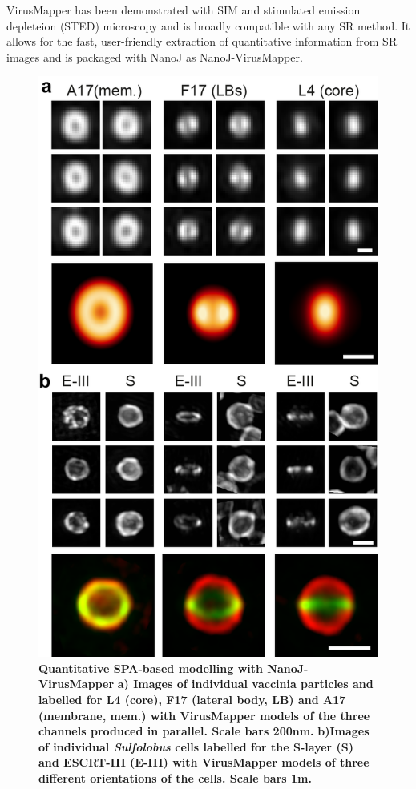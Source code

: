 VirusMapper has been demonstrated with SIM and stimulated emission depleteion (STED) microscopy \cite{Gray2016} and is broadly compatible with any SR method. It allows for the fast, user-friendly extraction of quantitative information from SR images and is packaged with NanoJ as NanoJ-VirusMapper.

\begin{figure}[!t]
    \centering
    \includegraphics[width=\linewidth]{Figures/NanoJ_VirusMapperFigure_rot.png}
    \caption{\textbf{Quantitative SPA-based modelling with NanoJ-VirusMapper} \textbf{a) Images of individual vaccinia particles and labelled for L4 (core), F17 (lateral body, LB) and A17 (membrane, mem.) with VirusMapper models of the three channels produced in parallel. Scale bars 200nm.} \textbf{b)Images of individual \emph{Sulfolobus} cells labelled for the S-layer (S) and ESCRT-III (E-III) with VirusMapper models of three different orientations of the cells. Scale bars 1\micro m. }}
    \label{fig:VirusMapper}
\end{figure}


